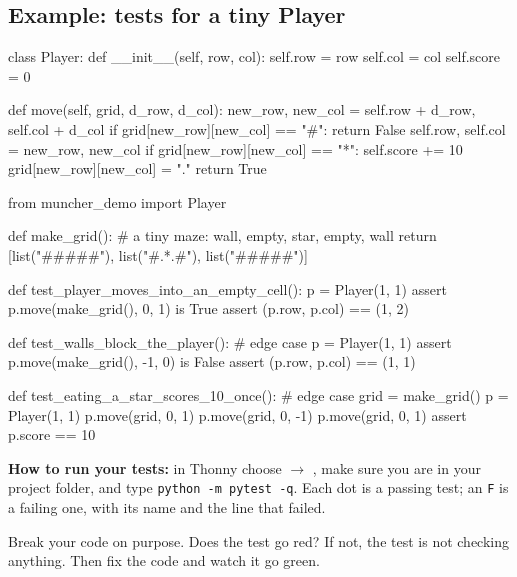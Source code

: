 \subsection{Example: tests for a tiny Player}
\begin{pycode}
class Player:
    def __init__(self, row, col):
        self.row = row
        self.col = col
        self.score = 0

    def move(self, grid, d_row, d_col):
        new_row, new_col = self.row + d_row, self.col + d_col
        if grid[new_row][new_col] == "#":
            return False
        self.row, self.col = new_row, new_col
        if grid[new_row][new_col] == "*":
            self.score += 10
            grid[new_row][new_col] = "."
        return True
\end{pycode}
\begin{pycode}
from muncher_demo import Player

def make_grid():   # a tiny maze: wall, empty, star, empty, wall
    return [list("#####"), list("#.*.#"), list("#####")]

def test_player_moves_into_an_empty_cell():
    p = Player(1, 1)
    assert p.move(make_grid(), 0, 1) is True
    assert (p.row, p.col) == (1, 2)

def test_walls_block_the_player():          # edge case
    p = Player(1, 1)
    assert p.move(make_grid(), -1, 0) is False
    assert (p.row, p.col) == (1, 1)

def test_eating_a_star_scores_10_once():    # edge case
    grid = make_grid()
    p = Player(1, 1)
    p.move(grid, 0, 1)
    p.move(grid, 0, -1)
    p.move(grid, 0, 1)
    assert p.score == 10
\end{pycode}
\textbf{How to run your tests:} in Thonny choose  $\rightarrow$ , make sure you are in your project folder, and type \texttt{python -m pytest -q}. Each dot is a passing test; an \texttt{F} is a failing one, with its name and the line that failed.

\begin{tip}
Break your code on purpose. Does the test go red? If not, the test is not checking anything. Then fix the code and watch it go green.
\end{tip}

